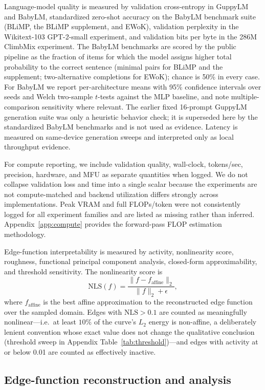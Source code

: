 \documentclass{article}
\newcommand{\nls}{\mathrm{NLS}}
\begin{document}
Language-model quality is measured by validation cross-entropy in GuppyLM and BabyLM, standardized zero-shot accuracy on the BabyLM benchmark suite (BLiMP, the BLiMP supplement, and EWoK), validation perplexity in the Wikitext-103 GPT-2-small experiment, and validation bits per byte in the 286M ClimbMix experiment. The BabyLM benchmarks are scored by the public pipeline as the fraction of items for which the model assigns higher total probability to the correct sentence (minimal pairs for BLiMP and the supplement; two-alternative completions for EWoK); chance is 50\% in every case. For BabyLM we report per-architecture means with 95\% confidence intervals over seeds and Welch two-sample \(t\)-tests against the MLP baseline, and note multiple-comparison sensitivity where relevant. The earlier fixed 16-prompt GuppyLM generation suite was only a heuristic behavior check; it is superseded here by the standardized BabyLM benchmarks and is not used as evidence. Latency is measured on same-device generation sweeps and interpreted only as local throughput evidence.

For compute reporting, we include validation quality, wall-clock, tokens/sec, precision, hardware, and MFU as separate quantities when logged. We do not collapse validation loss and time into a single scalar because the experiments are not compute-matched and backend utilization differs strongly across implementations. Peak VRAM and full FLOPs/token were not consistently logged for all experiment families and are listed as missing rather than inferred. Appendix~\ref{app:compute} provides the forward-pass FLOP estimation methodology.

Edge-function interpretability is measured by activity, nonlinearity score, roughness, functional principal component analysis, closed-form approximability, and threshold sensitivity. The nonlinearity score is
\[
\nls(f)=\frac{\lVert f-f_{\mathrm{affine}}\rVert_2}{\lVert f\rVert_2+\epsilon},
\]
where \(f_{\mathrm{affine}}\) is the best affine approximation to the reconstructed edge function over the sampled domain. Edges with \(\nls>0.1\) are counted as meaningfully nonlinear---i.e.\ at least \(10\%\) of the curve's \(L_2\) energy is non-affine, a deliberately lenient convention whose exact value does not change the qualitative conclusion (threshold sweep in Appendix Table~\ref{tab:threshold})---and edges with activity at or below 0.01 are counted as effectively inactive.

\subsection{Edge-function reconstruction and analysis}
\end{document}
